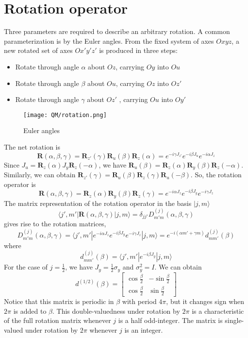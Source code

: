 \section{Rotation operator}
Three parameters are required to describe an arbitrary rotation. A common parameterization is by the Euler angles. From the fixed system of axes $Oxyz$, a new rotated set of axes $Ox'y'z'$ is produced in three steps:
\begin{itemize}
\item Rotate through angle $\alpha$ about $Oz$, carrying $Oy$ into $Ou$
\item Rotate through angle $\beta$ about $Ou$, carrying $Oz$ into $Oz'$
\item Rotate through angle $\gamma$ about $Oz'$ , carrying $Ou$ into $Oy'$
\end{itemize}
\begin{figure}[!h]
	\centering
	\texttt{[image: QM/rotation.png]}
	\caption{Euler angles}
\end{figure}
The net rotation is
\[\bm{R}(\alpha,\beta,\gamma) = \bm{R}_{z'}(\gamma) \bm{R}_{u}(\beta) \bm{R}_{z}(\alpha) = e^{-i\gamma J_{z'}} e^{-i\beta J_{u}} e^{-i\alpha J_{z}}\]
Since $J_u = \bm{R}_z(\alpha) J_y \bm{R}_z(-\alpha)$, we have $\bm{R}_u(\beta) = \bm{R}_z(\alpha) \bm{R}_y(\beta) \bm{R}_z(-\alpha)$. Similarly, we can obtain $\bm{R}_{z'}(\gamma) = \bm{R}_{u}(\beta) \bm{R}_z(\gamma) \bm{R}_u(-\beta)$. So, the rotation operator is
\[\bm{R}(\alpha,\beta,\gamma) = \bm{R}_{z}(\alpha) \bm{R}_{y}(\beta) \bm{R}_{z}(\gamma) = e^{-i\alpha J_{z}} e^{-i\beta J_{y}} e^{-i\gamma J_{z}}\]
The matrix representation of the rotation operator in the basis $|j,m\rangle$
\[\langle j',m' | \bm{R}(\alpha,\beta,\gamma) | j,m \rangle = \delta_{jj'} D_{m'm}^{(j)}(\alpha,\beta,\gamma)\]
gives rise to the rotation matrices,
\[D_{m'm}^{(j)}(\alpha,\beta,\gamma) = \langle j',m' | e^{-i\alpha J_{z}} e^{-i\beta J_{y}} e^{-i\gamma J_{z}} | j,m \rangle = e^{-i(\alpha m' + \gamma m)} d_{mm'}^{(j)}(\beta)\]
where
\[ d_{mm'}^{(j)}(\beta) = \langle j',m' | e^{-i\beta J_{y}} | j,m \rangle\]
For the case of $j = \frac{1}{2}$, we have $J_y = \frac{1}{2}\sigma_y$ and $\sigma_y^2 = I$. We can obtain
\[d^{(1/2)}(\beta) = \left[ \begin{matrix} \cos \frac{\beta}{2} & -\sin \frac{\beta}{2} \\ \cos \frac{\beta}{2}& \sin \frac{\beta}{2}\end{matrix} \right] \]
Notice that this matrix is periodic in $\beta$ with period $4\pi$, but it changes sign when $2\pi$ is added to $\beta$. This double-valuedness under rotation by $2\pi$ is a characteristic of the full rotation matrix whenever $j$ is a half odd-integer. The matrix is single-valued under rotation by $2\pi$ whenever $j$ is an integer.\\
